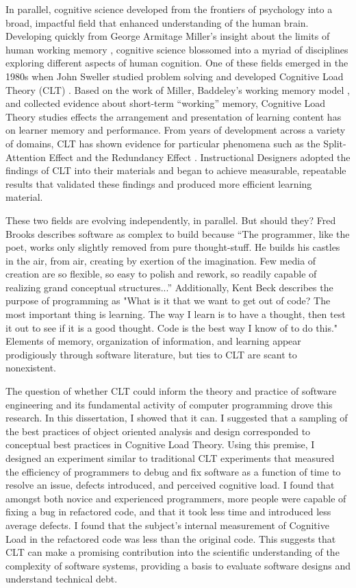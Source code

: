 In parallel, cognitive science developed from the frontiers of psychology into a broad, impactful field that enhanced understanding of the human brain. Developing quickly from George Armitage Miller’s insight about the limits of human working memory \cite{Miller1956}, cognitive science blossomed into a myriad of disciplines exploring different aspects of human cognition. One of these fields emerged in the 1980s when John Sweller studied problem solving and developed Cognitive Load Theory (CLT) . Based on the work of Miller, Baddeley’s working memory model \cite{Baddeley2003}, and collected evidence about short-term “working” memory, Cognitive Load Theory studies effects the arrangement and presentation of learning content has on learner memory and performance. From years of development across a variety of domains, CLT has shown evidence for particular phenomena such as the Split-Attention Effect \cite{Tarmizi1988} and the Redundancy Effect \cite{Sweller1991}. Instructional Designers adopted the findings of CLT into their materials and began to achieve measurable, repeatable results that validated these findings and produced more efficient learning material.

These two fields are evolving independently, in parallel. But should they? Fred Brooks describes software as complex to build because “The programmer, like the poet, works only slightly removed from pure thought-stuff. He builds his castles in the air, from air, creating by exertion of the imagination. Few media of creation are so flexible, so easy to polish and rework, so readily capable of realizing grand conceptual structures...” \cite{Brooks1995} Additionally, Kent Beck describes the purpose of programming as "What is it that we want to get out of code? The most important thing is learning. The way I learn is to have a thought, then test it out to see if it is a good thought. Code is the best way I know of to do this." \cite{Beck1999} Elements of memory, organization of information, and learning appear prodigiously through software literature, but ties to CLT are scant to nonexistent. 

The question of whether CLT could inform the theory and practice of software engineering and its fundamental activity of computer programming drove this research. In this dissertation, I showed that it can. I suggested that a sampling of the best practices of object oriented analysis and design corresponded to conceptual best practices in Cognitive Load Theory. Using this premise, I designed an experiment similar to traditional CLT experiments that measured the efficiency of programmers to debug and fix software as a function of time to resolve an issue, defects introduced, and perceived cognitive load. I found that amongst both novice and experienced programmers, more people were capable of fixing a bug in refactored code, and that it took less time and introduced less average defects. I found that the subject’s internal measurement of Cognitive Load in the refactored code was less than the original code. This suggests that CLT can make a promising contribution into the scientific understanding of the complexity of software systems, providing a basis to evaluate software designs and understand technical debt.
